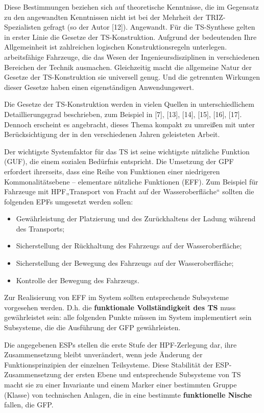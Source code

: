 \documentclass[11pt,a4paper]{article}
\begin{document}
Diese Bestimmungen beziehen sich auf theoretische Kenntnisse, die im Gegensatz
zu den angewandten Kenntnissen nicht ist bei der Mehrheit der
TRIZ-Spezialisten gefragt (so der Autor [12]). Angewandt.  Für die TS-Synthese
gelten in erster Linie die Gesetze der TS-Konstruktion. Aufgrund der
bedeutenden Ihre Allgemeinheit ist zahlreichen logischen Konstruktionsregeln
unterlegen.  arbeitsfähige Fahrzeuge, die das Wesen der Ingenieursdisziplinen
in verschiedenen Bereichen der Technik ausmachen.  Gleichzeitig macht die
allgemeine Natur der Gesetze der TS-Konstruktion sie universell genug.  Und
die getrennten Wirkungen dieser Gesetze haben einen eigenständigen
Anwendungswert.

Die Gesetze der TS-Konstruktion werden in vielen Quellen in unterschiedlichem
Detaillierungsgrad beschrieben, zum Beispiel in [7], [13], [14], [15], [16],
[17]. Dennoch erscheint es angebracht, dieses Thema kompakt zu umreißen mit
unter Berücksichtigung der in den verschiedenen Jahren geleisteten Arbeit.

Der wichtigste Systemfaktor für das TS ist seine wichtigste nützliche Funktion
(GUF), die einem sozialen Bedürfnis entspricht. Die Umsetzung der GPF
erfordert ihrerseits, dass eine Reihe von Funktionen einer niedrigeren
Kommonalitätsebene -- elementare nützliche Funktionen (EFF). Zum Beispiel für
Fahrzeuge mit HPF„Transport von Fracht auf der Wasseroberfläche“ sollten die
folgenden EPFs umgesetzt werden sollen:
\begin{itemize}
\item Gewährleistung der Platzierung und des Zurückhaltens der Ladung während
  des Transports;
\item Sicherstellung der Rückhaltung des Fahrzeugs auf der Wasseroberfläche;
\item Sicherstellung der Bewegung des Fahrzeugs auf der Wasseroberfläche;
\item Kontrolle der Bewegung des Fahrzeugs.
\end{itemize}
Zur Realisierung von EFF im System sollten entsprechende Subsysteme vorgesehen
werden. D.h.  die \textbf{funktionale Vollständigkeit des TS} muss
gewährleistet sein: alle folgenden Punkte müssen im System implementiert sein
Subsysteme, die die Ausführung der GFP gewährleisten.

Die angegebenen ESPs stellen die erste Stufe der HPF-Zerlegung dar, ihre
Zusammensetzung bleibt unverändert, wenn jede Änderung der Funktionsprinzipien
der einzelnen Teilsysteme. Diese Stabilität der ESP-Zusammensetzung der ersten
Ebene und entsprechende Subsysteme von TS macht sie zu einer Invariante und
einem Marker einer bestimmten Gruppe (Klasse) von technischen Anlagen, die in
eine bestimmte \textbf{funktionelle Nische} fallen, die GFP.
\end{document}
